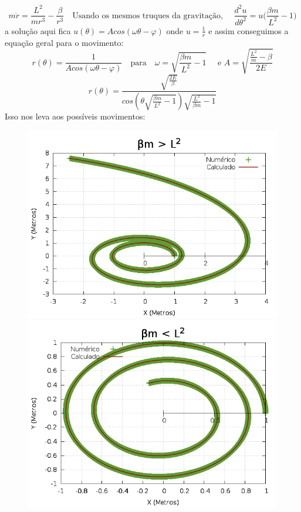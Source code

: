 \documentclass[a4paper,12pt]{exam}
\begin{document}
		\[ m\ddot{r} = \frac{L^2}{mr^3} - \frac{\beta}{r^3} \quad \text{
		Usando os mesmos truques da gravitação, } \quad \frac{d^2u}{d\theta^2}  = u \Big( \frac{\beta m}{L^2} - 1 \Big) \]
		a solução aqui fica $ u(\theta) = Acos(\omega \theta - \varphi) $ onde $u=\frac{1}{r}$ e assim conseguimos a equação geral para o movimento:
		\[ r(\theta) = \frac{1}{Acos(\omega \theta - \varphi)} \quad \text{para} \quad \omega = \sqrt{\frac{\beta m}{L^2} - 1} \quad \text{ e } A = \sqrt{\frac{\frac{L^2}{m} - \beta}{2E}}\]
		\[ r(\theta) = \frac{\sqrt{\frac{2E}{\beta}}}{cos( \theta \sqrt{\frac{\beta m}{L^2} - 1} ) \sqrt{\frac{L^2}{\beta m} - 1}  } \]
		Isso nos leva aos possíveis movimentos:
		\begin{figure}[h]
			\centering
			\includegraphics[scale=0.23]{3o0.png}
			\includegraphics[scale=0.23]{3o1.png}

\end{figure}
\end{document}
